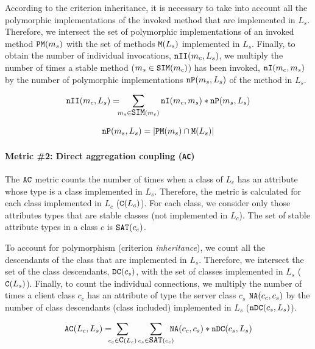 According to the criterion inheritance, it is necessary to take into account all the polymorphic implementations of the invoked method that are implemented in $L_s$. Therefore, we intersect the set of polymorphic implementations of an invoked method $\verb|PM|(m_s)$ with the set of methods $\verb|M|(L_s)$ implemented in $L_s$. Finally, to obtain the number of individual invocations, $\verb|nII|(m_c,L_s)$, we multiply the number of times a stable method ($m_s \in \verb|SIM|(m_c)$) has been invoked, $\verb|nI|(m_c, m_s)$ by the number of polymorphic implementations $\verb|nP|(m_s, L_s)$ of the method in $L_s$.

\begin{equation}
\label{eqn:mic-nii}
   \verb|nII|(m_c, L_s) =\!\!\! \sum_{m_s \in \verb|SIM|(m_c)} \verb|nI|(m_c, m_s)*\verb|nP|(m_s, L_s)
\end{equation}

\begin{equation}
\label{eqn:mic-np}
    \verb|nP|(m_s, L_s) = |\verb|PM|(m_s) \cap \verb|M|(L_s)|
\end{equation}

\paragraph{Metric \#2: Direct aggregation coupling (\texttt{AC})}

The $\verb|AC|$ metric counts the number of times when a class of $L_c$ has an attribute whose type is a class implemented in $L_s$. Therefore, the metric is calculated for each class implemented in $L_c$ ($\verb|C|(L_c)$). For each class, we consider only those attributes types that are stable classes (not implemented in $L_c$). The set of stable attribute types in a class $c$ is $\verb|SAT|(c_c)$.

To account for polymorphism (criterion \textit{inheritance}), we count all the descendants of the class that are implemented in $L_s$. Therefore, we intersect the set of the class descendants, $\verb|DC|(c_s)$, with the set of
classes implemented in $L_s$ ($\verb|C|(L_s)$). Finally, to count the  individual connections, we multiply the number of times a client class $c_c$ has an attribute of type the server class $c_s$ $\verb|NA|(c_c, c_s)$ by the number of class descendants (class included) implemented in $L_s$ ($\verb|nDC|(c_s,L_s)$).

\begin{equation}
\label{eqn:ac}
  \verb|AC|(L_c,L_s) = \!\!\!\!\sum_{c_c \in \verb|C|(L_c)} \sum_{c_s \in \verb|SAT|(c_c)} \!\!\!\!\verb|NA|(c_c, c_s)*\verb|nDC|(c_s, L_s)
\end{equation}

